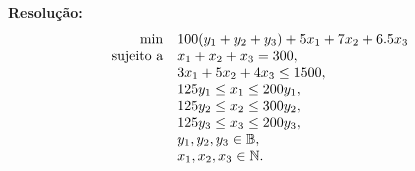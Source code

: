\documentclass{article}
\newcommand{\N}{\mathbb{N}}
\begin{document}
\begin{enumerate}[resume*=exerc]
\begin{enumerate}[label=(\alph*),series=q5]
\begin{framed}
{\bf Resolução:}
    \[
    \begin{array}{rl}
      \min & 100(y_1+y_2+y_3)+5x_1 + 7x_2 + 6.5 x_3 \\
      \text{sujeito a} & x_1 + x_2 + x_3 = 300,\\
      & 3x_1 + 5x_2 + 4x_3 \leq 1500,\\
      &125 y_1 \leq x_1 \leq 200 y_1,\\
      &125 y_2 \leq x_2 \leq 300 y_2,\\
      &125 y_3 \leq x_3 \leq 200 y_3,\\
      &y_1,y_2,y_3 \in \mathbb{B},\\
      &x_1,x_2,x_3 \in \N.
    \end{array}
    \vspace{1cm}
    \]
\end{framed}
\end{enumerate}
\end{enumerate}

\pagebreak
\end{document}

